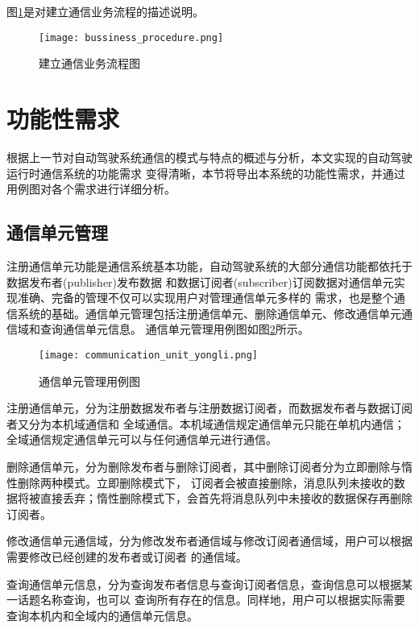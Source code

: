 图\ref{bussiness_procedure}是对建立通信业务流程的描述说明。
\begin{figure}[H]
  \centering
  \texttt{[image: bussiness\_procedure.png]}
  \caption{建立通信业务流程图}
  \label{bussiness_procedure}
\end{figure}

\section{功能性需求}
根据上一节对自动驾驶系统通信的模式与特点的概述与分析，本文实现的自动驾驶运行时通信系统的功能需求
变得清晰，本节将导出本系统的功能性需求，并通过用例图对各个需求进行详细分析。

\subsection{通信单元管理}
注册通信单元功能是通信系统基本功能，自动驾驶系统的大部分通信功能都依托于数据发布者(publisher)发布数据
和数据订阅者(subscriber)订阅数据对通信单元实现准确、完备的管理不仅可以实现用户对管理通信单元多样的
需求，也是整个通信系统的基础。通信单元管理包括注册通信单元、删除通信单元、修改通信单元通信域和查询通信单元信息。
通信单元管理用例图如图\ref{communication_unit_yongli}所示。

\begin{figure}[H]
  \centering
  \texttt{[image: communication\_unit\_yongli.png]}
  \caption{通信单元管理用例图}
  \label{communication_unit_yongli}
\end{figure}

注册通信单元，分为注册数据发布者与注册数据订阅者，而数据发布者与数据订阅者又分为本机域通信和
全域通信。本机域通信规定通信单元只能在单机内通信；全域通信规定通信单元可以与任何通信单元进行通信。

删除通信单元，分为删除发布者与删除订阅者，其中删除订阅者分为立即删除与惰性删除两种模式。立即删除模式下，
订阅者会被直接删除，消息队列未接收的数据将被直接丢弃；惰性删除模式下，会首先将消息队列中未接收的数据保存再删除
订阅者。

修改通信单元通信域，分为修改发布者通信域与修改订阅者通信域，用户可以根据需要修改已经创建的发布者或订阅者
的通信域。

查询通信单元信息，分为查询发布者信息与查询订阅者信息，查询信息可以根据某一话题名称查询，也可以
查询所有存在的信息。同样地，用户可以根据实际需要查询本机内和全域内的通信单元信息。

